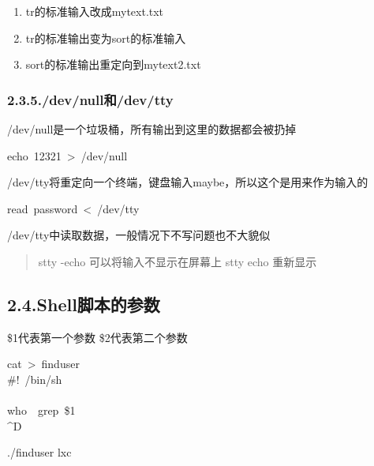 \documentclass{article}
\begin{document}
\begin{enumerate}[noitemsep,topsep=\mdcompacttopsep]%

\item tr的标准输入改成mytext.txt%

\item tr的标准输出变为sort的标准输入%

\item sort的标准输出重定向到mytext2.txt%
\end{enumerate}%

\subsubsection{2.3.5.\hspace*{0.5em}/dev/null和/dev/tty}\label{sec-devnulldevtty}%

\noindent/dev/null是一个垃圾桶，所有输出到这里的数据都会被扔掉%
\begin{mdpre}%
\noindent{}echo~12321~\textgreater{}~/dev/null%
\end{mdpre}\noindent/dev/tty将重定向一个终端，键盘输入maybe，所以这个是用来作为输入的
\begin{mdpre}%
\noindent{}read~password~\textless{}~/dev/tty%
\end{mdpre}/dev/tty中读取数据，一般情况下不写问题也不大貌似

\begin{quote}%

\noindent stty -echo\mdbr
可以将输入不显示在屏幕上\mdbr
stty echo\mdbr
重新显示%
\end{quote}%

\subsection{2.4.\hspace*{0.5em}Shell脚本的参数}\label{sec-shell}%

\noindent\$1代表第一个参数
\$2代表第二个参数%
\begin{mdpre}%
\noindent{}cat~\textgreater{}~finduser\\
\#!~/bin/sh\\
\\
who~\textbar{}~grep~\$1\\
\textasciicircum{}D%
\end{mdpre}./finduser lxc
\end{document}

